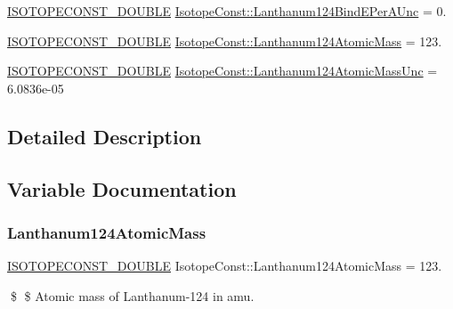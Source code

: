 \begin{DoxyCompactItemize}
\mbox{\hyperlink{group___isotope_const-_macros_ga8f45a7272ce02c0b4c65c44636ed719a}{I\+S\+O\+T\+O\+P\+E\+C\+O\+N\+S\+T\+\_\+\+D\+O\+U\+B\+LE}} \mbox{\hyperlink{group___isotope_const-_lanthanum-_la124_gaa3aa14318ac61b6d64b01da42663eac9}{Isotope\+Const\+::\+Lanthanum124\+Bind\+E\+Per\+A\+Unc}} = 0.
\item 
\mbox{\hyperlink{group___isotope_const-_macros_ga8f45a7272ce02c0b4c65c44636ed719a}{I\+S\+O\+T\+O\+P\+E\+C\+O\+N\+S\+T\+\_\+\+D\+O\+U\+B\+LE}} \mbox{\hyperlink{group___isotope_const-_lanthanum-_la124_ga43f6f0ef6f0f0a65faca97d930ea54ed}{Isotope\+Const\+::\+Lanthanum124\+Atomic\+Mass}} = 123.
\item 
\mbox{\hyperlink{group___isotope_const-_macros_ga8f45a7272ce02c0b4c65c44636ed719a}{I\+S\+O\+T\+O\+P\+E\+C\+O\+N\+S\+T\+\_\+\+D\+O\+U\+B\+LE}} \mbox{\hyperlink{group___isotope_const-_lanthanum-_la124_ga5bdec33108239aac73623d835e5fe7fd}{Isotope\+Const\+::\+Lanthanum124\+Atomic\+Mass\+Unc}} = 6.\+0836e-\/05
\end{DoxyCompactItemize}


\subsection{Detailed Description}


\subsection{Variable Documentation}
\mbox{\label{group___isotope_const-_lanthanum-_la124_ga43f6f0ef6f0f0a65faca97d930ea54ed}} 
\subsubsection{\texorpdfstring{Lanthanum124\+Atomic\+Mass}{Lanthanum124AtomicMass}}
{\footnotesize\ttfamily \mbox{\hyperlink{group___isotope_const-_macros_ga8f45a7272ce02c0b4c65c44636ed719a}{I\+S\+O\+T\+O\+P\+E\+C\+O\+N\+S\+T\+\_\+\+D\+O\+U\+B\+LE}} Isotope\+Const\+::\+Lanthanum124\+Atomic\+Mass = 123.}

\$ \$ Atomic mass of Lanthanum-\/124 in amu. \mbox{\label{group___isotope_const-_lanthanum-_la124_ga5bdec33108239aac73623d835e5fe7fd}} 
